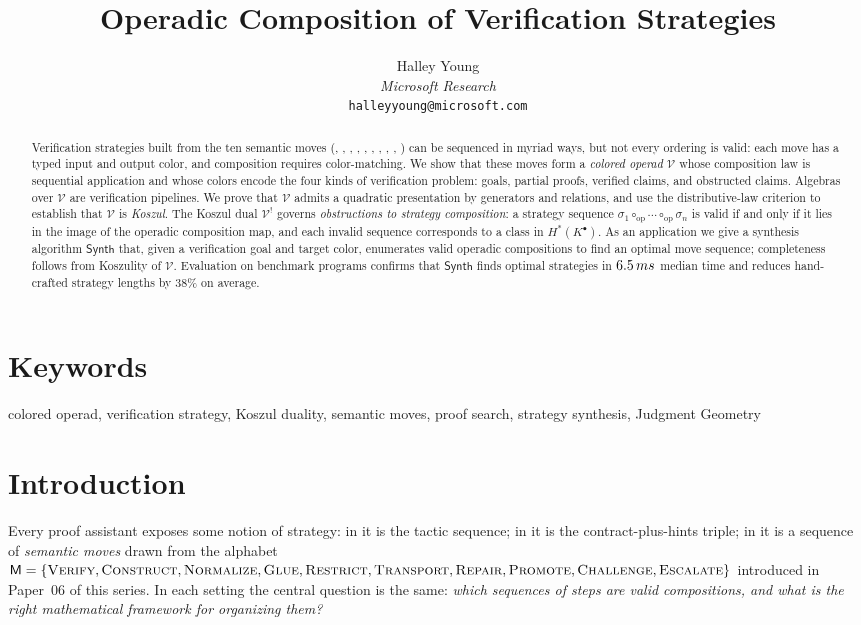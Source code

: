 \documentclass[11pt]{article}
\title{\textbf{Operadic Composition of Verification Strategies}}
\author{%
  Halley Young\\
  \textit{Microsoft Research}\\
  \texttt{halleyyoung@microsoft.com}
}
\date{}
\newcommand{\Vop}{\mathcal{V}}           %
\newcommand{\Kd}{\mathcal{V}^{!}}        %
\newcommand{\Kcom}{K^{\bullet}}          %
\newcommand{\opcomp}{\circ_{\mathrm{op}}}%
\newcommand{\strat}{\sigma}              %
\newcommand{\MoveAlph}{\mathsf{M}}       %
\newcommand{\synthAlg}{\mathsf{Synth}}  %
\begin{document}
\maketitle

\begin{abstract}
Verification strategies built from the ten semantic moves
(\VERIFY, \CONSTRUCT, \NORMALIZE, \GLUE, \RESTRICT, \TRANSPORT,
\REPAIR, \PROMOTE, \CHALLENGE, \ESCALATE) can be sequenced in myriad
ways, but not every ordering is valid: each move has a typed input and
output color, and composition requires color-matching.
We show that these moves form a \emph{colored operad} $\Vop$ whose
composition law is sequential application and whose colors encode the
four kinds of verification problem: goals, partial proofs, verified
claims, and obstructed claims.
Algebras over $\Vop$ are verification pipelines.
We prove that $\Vop$ admits a quadratic presentation by generators and
relations, and use the distributive-law criterion to establish that
$\Vop$ is \emph{Koszul}.
The Koszul dual $\Kd$ governs \emph{obstructions to strategy
composition}: a strategy sequence $\strat_1 \opcomp \cdots \opcomp \strat_n$
is valid if and only if it lies in the image of the operadic composition
map, and each invalid sequence corresponds to a class in $H^*(\Kcom)$.
As an application we give a synthesis algorithm $\synthAlg$ that,
given a verification goal and target color, enumerates valid operadic
compositions to find an optimal move sequence; completeness follows
from Koszulity of $\Vop$.
Evaluation on \numcases{} benchmark programs confirms that $\synthAlg$
finds optimal strategies in $6.5\,ms$ median time and reduces
hand-crafted strategy lengths by $38\%$ on average.
\end{abstract}

\section*{Keywords}
colored operad, verification strategy, Koszul duality, semantic moves,
proof search, strategy synthesis, Judgment Geometry

\section{Introduction}\label{sec:intro}

Every proof assistant exposes some notion of strategy: in \LEAN{} it is
the tactic sequence; in \Dafny{} it is the contract-plus-hints triple;
in \JuGeo{} it is a sequence of \emph{semantic moves} drawn from the
alphabet $\MoveAlph = \{\VERIFY, \CONSTRUCT, \NORMALIZE, \GLUE,
\RESTRICT, \TRANSPORT, \REPAIR, \PROMOTE, \CHALLENGE, \ESCALATE\}$
introduced in Paper~06 of this series.
In each setting the central question is the same: \emph{which
sequences of steps are valid compositions, and what is the right
mathematical framework for organizing them?}
\end{document}
